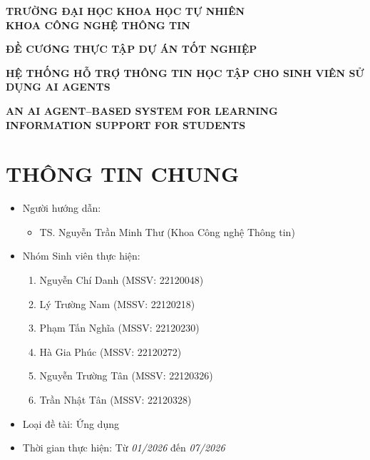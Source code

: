 \documentclass{article}[13pt]
\begin{document}
    \begin{center}
        \textbf{TRƯỜNG ĐẠI HỌC KHOA HỌC TỰ NHIÊN\\KHOA CÔNG NGHỆ THÔNG TIN}
    \end{center}

    \vspace{.5cm}

    \begin{center}
        \Large\bfseries ĐỀ CƯƠNG THỰC TẬP DỰ ÁN TỐT NGHIỆP \\[0.8cm]

        {\Large\bfseries HỆ THỐNG HỖ TRỢ THÔNG TIN HỌC TẬP CHO SINH VIÊN SỬ DỤNG AI AGENTS\par}
        \vspace{.6cm}

        {\Large\bfseries AN AI AGENT--BASED SYSTEM FOR LEARNING INFORMATION SUPPORT FOR STUDENTS\par}
        \vspace{.5cm}
    \end{center}

    \vspace{.5cm}

    \Large
    \section{THÔNG TIN CHUNG}
    \begin{itemize}[label = {}]

        \item {Người hướng dẫn:}
        \begin{itemize}
            \item TS. Nguyễn Trần Minh Thư (Khoa Công nghệ Thông tin)
        \end{itemize}{}

        \item {Nhóm Sinh viên thực hiện:}
        \begin{enumerate}
            \item Nguyễn Chí Danh (MSSV: 22120048)
            \item Lý Trường Nam (MSSV: 22120218)
            \item Phạm Tấn Nghĩa (MSSV: 22120230)
            \item Hà Gia Phúc (MSSV: 22120272)
            \item Nguyễn Trường Tân (MSSV: 22120326)
            \item Trần Nhật Tân (MSSV: 22120328)
        \end{enumerate}

        \item {Loại đề tài:} Ứng dụng

        \item {Thời gian thực hiện:} Từ \textit{01/2026} đến \textit{07/2026}

    \end{itemize}
\end{document}
